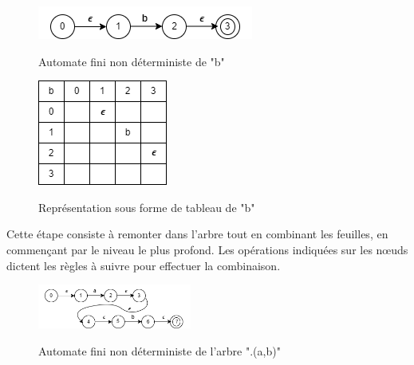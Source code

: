 \documentclass{article}
\begin{document}
\newpage
\begin{figure}[h]
    \begin{minipage}{0.3\textwidth}
        \centering
        \includegraphics[width=\textwidth]{ressources/NDFA_b.png}
        \caption{Automate fini non déterministe de "b"}
        \label{fig:ndfa_b}
        \cite{ndfa_b}
    \end{minipage}
    \hspace{5cm} %
    \begin{minipage}{0.25\textwidth}
        \centering
        \includegraphics[width=\textwidth]{ressources/NDFA_b.tab.png}
        \caption{Représentation sous forme de tableau de "b"}
        \label{fig:ndfa_tab_b}
        \cite{ndfa_tab_b}
    \end{minipage}
\end{figure}

Cette étape consiste à remonter dans l'arbre tout en combinant les feuilles, en commençant par le niveau le plus profond. Les opérations indiquées sur les nœuds dictent les règles à suivre pour effectuer la combinaison.

\begin{figure}[h] %
    \centering
    \includegraphics[width=0.45\textwidth]{./ressources/NDFA_ab.png}
    \caption{Automate fini non déterministe de l'arbre ".(a,b)"}
    \cite{ndfa_ab}
    \label{fig:ndfa_ab}
\end{figure}
\end{document}

